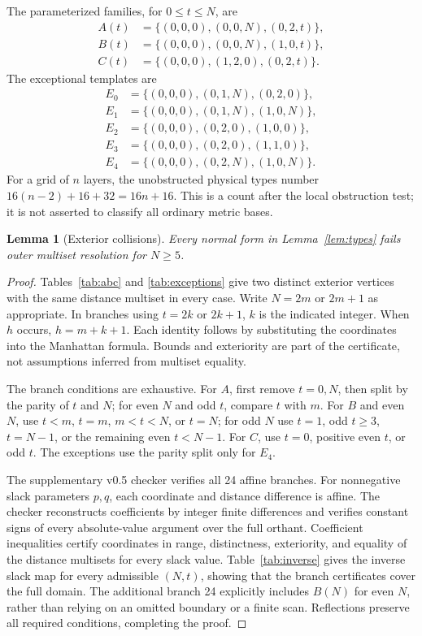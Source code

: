 \documentclass[11pt,a4paper]{article}
\newtheorem{lemma}{Lemma}
\begin{document}
The parameterized families, for $0\le t\le N$, are
\begin{align*}
A(t)&=\{(0,0,0),(0,0,N),(0,2,t)\},\\
B(t)&=\{(0,0,0),(0,0,N),(1,0,t)\},\\
C(t)&=\{(0,0,0),(1,2,0),(0,2,t)\}.
\end{align*}
The exceptional templates are
\begin{align*}
E_0&=\{(0,0,0),(0,1,N),(0,2,0)\},\\
E_1&=\{(0,0,0),(0,1,N),(1,0,N)\},\\
E_2&=\{(0,0,0),(0,2,0),(1,0,0)\},\\
E_3&=\{(0,0,0),(0,2,0),(1,1,0)\},\\
E_4&=\{(0,0,0),(0,2,N),(1,0,N)\}.
\end{align*}
For a grid of $n$ layers, the unobstructed physical types number $16(n-2)+16+32=16n+16$. This is a count after the local obstruction test; it is not asserted to classify all ordinary metric bases.

\begin{lemma}[Exterior collisions]\label{lem:collisions}
Every normal form in Lemma~\ref{lem:types} fails outer multiset resolution for $N\ge5$.
\end{lemma}
\begin{proof}
Tables~\ref{tab:abc} and \ref{tab:exceptions} give two distinct exterior vertices with the same distance multiset in every case. Write $N=2m$ or $2m+1$ as appropriate. In branches using $t=2k$ or $2k+1$, $k$ is the indicated integer. When $h$ occurs, $h=m+k+1$. Each identity follows by substituting the coordinates into the Manhattan formula. Bounds and exteriority are part of the certificate, not assumptions inferred from multiset equality.

The branch conditions are exhaustive. For $A$, first remove $t=0,N$, then split by the parity of $t$ and $N$; for even $N$ and odd $t$, compare $t$ with $m$. For $B$ and even $N$, use $t<m$, $t=m$, $m<t<N$, or $t=N$; for odd $N$ use $t=1$, odd $t\ge3$, $t=N-1$, or the remaining even $t<N-1$. For $C$, use $t=0$, positive even $t$, or odd $t$. The exceptions use the parity split only for $E_4$.

The supplementary v0.5 checker verifies all 24 affine branches. For nonnegative slack parameters $p,q$, each coordinate and distance difference is affine. The checker reconstructs coefficients by integer finite differences and verifies constant signs of every absolute-value argument over the full orthant. Coefficient inequalities certify coordinates in range, distinctness, exteriority, and equality of the distance multisets for every slack value. Table~\ref{tab:inverse} gives the inverse slack map for every admissible $(N,t)$, showing that the branch certificates cover the full domain. The additional branch 24 explicitly includes $B(N)$ for even $N$, rather than relying on an omitted boundary or a finite scan. Reflections preserve all required conditions, completing the proof.
\end{proof}
\end{document}
